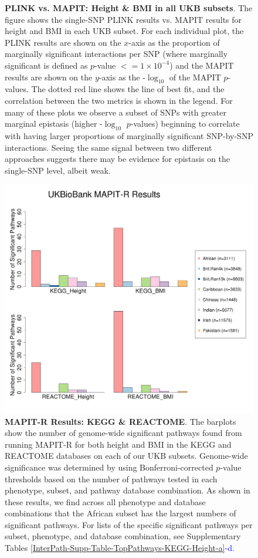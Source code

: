 \documentclass[12pt, a4paper]{article}
\begin{document}
\begin{figure} [t!]
\caption[TBD]{\textbf{PLINK vs. MAPIT: Height \& BMI in all UKB subsets}. The figure shows the single-SNP PLINK results vs. MAPIT results for height and BMI in each UKB subset. For each individual plot, the PLINK results are shown on the $x$-axis as the proportion of marginally significant interactions per SNP (where marginally significant is defined as $p$-value $<= 1\times10^{-4}$) and the MAPIT results are shown on the $y$-axis as the -$\log_{10}$ of the MAPIT $p$-values. The dotted red line shows the line of best fit, and the correlation between the two metrics is shown in the legend. For many of these plots we observe a subset of SNPs with greater marginal epistasis (higher -$\log_{10}$ $p$-values) beginning to correlate with having larger proportions of marginally significant SNP-by-SNP interactions. Seeing the same signal between two different approaches suggests there may be evidence for epistasis on the single-SNP level, albeit weak.}
\label{InterPath-Supp-Figure-MAPITvsPLINK-HeightBMI-All-caption}
\end{figure}
\clearpage

\begin{figure}[htbp]
\centering
\includegraphics[scale=.35]{Images/Supp/InterPath_Supp_Figure_Barplots_vs2.png}
\caption[TBD]{\textbf{MAPIT-R Results: KEGG \& REACTOME}. The barplots show the number of genome-wide significant pathways found from running MAPIT-R for both height and BMI in the KEGG and REACTOME databases on each of our UKB subsets. Genome-wide significance was determined by using Bonferroni-corrected $p$-value thresholds based on the number of pathways tested in each phenotype, subset, and pathway database combination. As shown in these results, we find across all phenotype and database combinations that the African subset has the largest numbers of significant pathways. For lists of the specific significant pathways per subset, phenotype, and database combination, see Supplementary Tables \ref{InterPath-Supp-Table-TopPathways-KEGG-Height-a}\textcolor{blue}{-d}.}
\label{InterPath-Supp-Figure-Barplots-All}
\end{figure}
\clearpage
\end{document}
